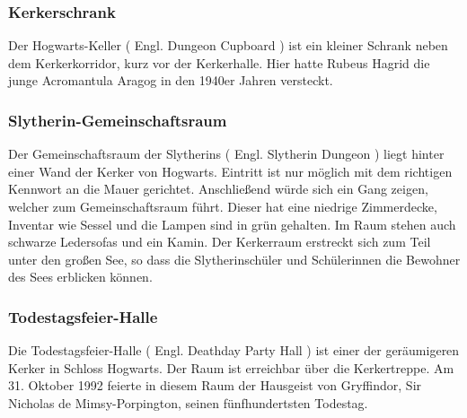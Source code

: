 \documentclass[a4paper, 10pt]{article}
\begin{document}
\subsubsection*{\large Kerkerschrank}
Der Hogwarts-Keller (  Engl.  Dungeon Cupboard ) ist ein kleiner Schrank neben dem Kerkerkorridor, kurz vor der Kerkerhalle. Hier hatte Rubeus Hagrid die junge Acromantula Aragog in den 1940er Jahren versteckt.
\subsubsection*{\large Slytherin-Gemeinschaftsraum}
Der Gemeinschaftsraum der Slytherins (  Engl.  Slytherin Dungeon ) liegt hinter einer Wand der Kerker von Hogwarts. Eintritt ist nur möglich mit dem richtigen Kennwort an die Mauer gerichtet. Anschließend würde sich ein Gang zeigen, welcher zum Gemeinschaftsraum führt. Dieser hat eine niedrige Zimmerdecke, Inventar wie Sessel und die Lampen sind in grün gehalten. Im Raum stehen auch schwarze Ledersofas und ein Kamin. Der Kerkerraum erstreckt sich zum Teil unter den großen See, so dass die Slytherinschüler und Schülerinnen die Bewohner des Sees erblicken können.
\subsubsection*{\large Todestagsfeier-Halle}
Die Todestagsfeier-Halle (  Engl.  Deathday Party Hall )  ist einer der geräumigeren Kerker in Schloss Hogwarts. Der Raum ist erreichbar über die Kerkertreppe. Am 31. Oktober 1992 feierte in diesem Raum der Hausgeist von Gryffindor, Sir Nicholas de Mimsy-Porpington, seinen fünfhundertsten Todestag.
\end{document}
